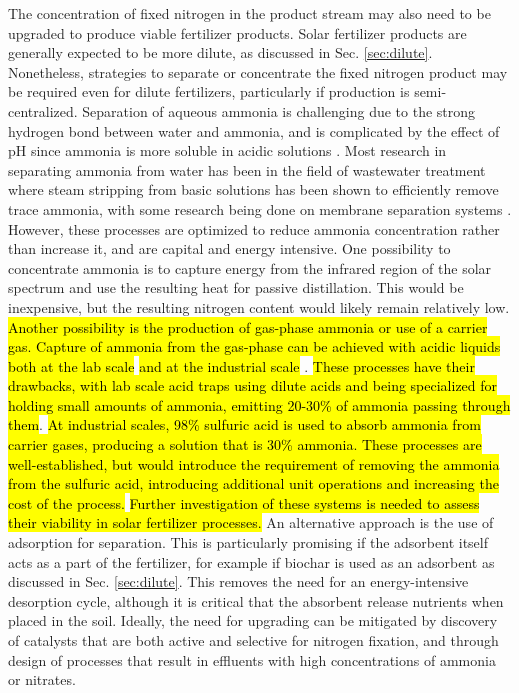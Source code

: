 The concentration of fixed nitrogen in the product stream may also need to be upgraded to produce viable fertilizer products. Solar fertilizer products are generally expected to be more dilute, as discussed in Sec. \ref{sec:dilute}. Nonetheless, strategies to separate or concentrate the fixed nitrogen product may be required even for dilute fertilizers, particularly if production is semi-centralized. Separation of aqueous ammonia is challenging due to the strong hydrogen bond between water and ammonia, and is complicated by the effect of pH since ammonia is more soluble in acidic solutions \cite{Ndegwa_2009}. Most research in separating ammonia from water has been in the field of wastewater treatment where steam stripping from basic solutions has been shown to efficiently remove trace ammonia, with some research being done on membrane separation systems \cite{Yin_2018, Kinidi_2018, Hasano_lu_2010}. However, these processes are optimized to reduce ammonia concentration rather than increase it, and are capital and energy intensive. One possibility to concentrate ammonia is to capture energy from the infrared region of the solar spectrum and use the resulting heat for passive distillation. This would be inexpensive, but the resulting nitrogen content would likely remain relatively low. \hl{Another possibility is the production of gas-phase ammonia or use of a carrier gas. Capture of ammonia from the gas-phase can be achieved with acidic liquids both at the lab scale} \cite{Ndegwa_2009} \hl{and at the industrial scale} \cite{Kinidi_2018}. \hl{These processes have their drawbacks, with lab scale acid traps using dilute acids and being specialized for holding small amounts of ammonia, emitting 20-30\% of ammonia passing through them}\cite{Ndegwa_2009}. \hl{At industrial scales, 98\% sulfuric acid is used to absorb ammonia from carrier gases, producing a solution that is 30\% ammonia. These processes are well-established, but would introduce the requirement of removing the ammonia from the sulfuric acid, introducing additional unit operations and increasing the cost of the process.} \cite{Kinidi_2018} \hl{Further investigation of these systems is needed to assess their viability in solar fertilizer processes.} An alternative approach is the use of adsorption for separation. This is particularly promising if the adsorbent itself acts as a part of the fertilizer, for example if biochar is used as an adsorbent as discussed in Sec. \ref{sec:dilute}. This removes the need for an energy-intensive desorption cycle, although it is critical that the absorbent release nutrients when placed in the soil. Ideally, the need for upgrading can be mitigated by discovery of catalysts that are both active and selective for nitrogen fixation, and through design of processes that result in effluents with high concentrations of ammonia or nitrates. 


